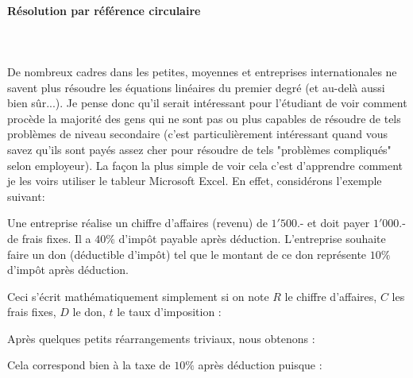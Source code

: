 	\paragraph{Résolution par référence circulaire}\mbox{}\\\\
	De nombreux cadres dans les petites, moyennes et entreprises internationales ne savent plus résoudre les équations linéaires du premier degré (et au-delà aussi bien sûr...). Je pense donc qu'il serait intéressant pour l'étudiant de voir comment procède la majorité des gens qui ne sont pas ou plus capables de résoudre de tels problèmes de niveau secondaire (c'est particulièrement intéressant quand vous savez qu'ils sont payés assez cher pour résoudre de tels "problèmes compliqués" selon employeur). La façon la plus simple de voir cela c'est d'apprendre comment je les voirs utiliser le tableur Microsoft Excel. En effet, considérons l'exemple suivant:

	Une entreprise réalise un chiffre d'affaires (revenu) de $1'500$.- et doit payer $1'000$.- de frais fixes. Il a $40\%$ d'impôt payable après déduction. L'entreprise souhaite faire un don (déductible d'impôt) tel que le montant de ce don représente $10\%$ d'impôt après déduction.

	Ceci s'écrit mathématiquement simplement si on note $R$ le chiffre d'affaires, $C$ les frais fixes, $D$ le don, $t$ le taux d'imposition :
	
	Après quelques petits réarrangements triviaux, nous obtenons :
	
	Cela correspond bien à la taxe de $10\%$ après déduction puisque :
	
